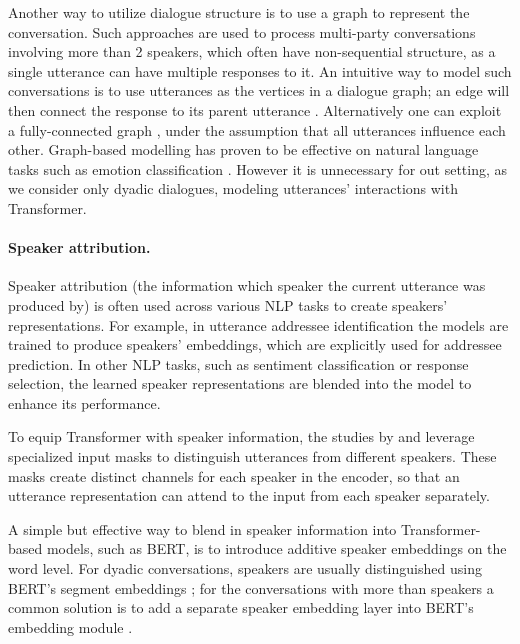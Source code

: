 Another way to utilize dialogue structure is to use a graph to represent the conversation. Such approaches are used to process multi-party conversations involving more than 2 speakers, which often have non-sequential structure, as a single utterance can have multiple responses to it. An intuitive way to model such conversations is to use utterances as the vertices in a dialogue graph; an edge will then connect the response to its parent utterance \cite{hu2019gsn}. Alternatively one can exploit a fully-connected graph \cite{ghosal2019dialoguegcn}, under the assumption that all utterances influence each other. Graph-based modelling has proven to be effective on natural language tasks such as emotion classification \cite{zhang2019modeling, ghosal2019dialoguegcn}. However it is unnecessary for out setting, as we consider only dyadic dialogues, modeling utterances' interactions with Transformer. %

\paragraph{Speaker attribution.} Speaker attribution (the information which speaker the current utterance was produced by) is often used across various NLP tasks to create speakers' representations. For example, in utterance addressee identification \cite{le2019speaking, ouchi2016addressee} the models are trained to produce speakers' embeddings, which are explicitly used for addressee prediction. In other NLP tasks, such as sentiment classification or response selection, the learned speaker representations are blended into the model to enhance its performance.

To equip Transformer with speaker information, the studies by \citet{liu2021filling} and \citet{li2020hierarchical2} leverage specialized input masks to distinguish utterances from different speakers. These masks create distinct channels for each speaker in the encoder, so that an utterance representation can attend to the input from each speaker separately.

A simple but effective way to blend in speaker information into Transformer-based models, such as BERT, is to introduce additive speaker embeddings on the word level. For dyadic conversations, speakers are usually distinguished using BERT's segment embeddings \cite{lu2020improving}; for the conversations with more than speakers a common solution is to 
add a separate speaker embedding layer into BERT's embedding module \cite{gu2020speaker, yu-etal-2020-dialogue}.

